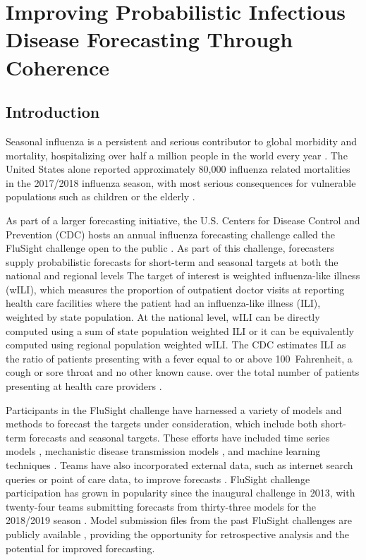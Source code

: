 \documentclass{umassthesis}          %
\begin{document}
\chapter{Improving Probabilistic Infectious Disease Forecasting Through Coherence}
\section{Introduction}
Seasonal influenza is a persistent and serious contributor to global morbidity and mortality, hospitalizing over half a million people in the world every year \cite{lafond2016global}. The United States alone reported approximately 80,000 influenza related mortalities in the 2017/2018 influenza season, with most serious consequences for vulnerable populations such as children or the elderly \cite{reed2015estimating}.

As part of a larger forecasting initiative, the U.S. Centers for Disease Control and Prevention (CDC) hosts an annual influenza forecasting challenge called the FluSight challenge open to the public \cite{mcgowan2019collaborative}\cite{biggerstaff2018results}. As part of this challenge, forecasters supply probabilistic forecasts for short-term and seasonal targets at both the national and regional levels The target of interest is weighted influenza-like illness (wILI), which measures the proportion of outpatient doctor visits at reporting health care facilities where the patient had an influenza-like illness (ILI), weighted by state population. At the national level, wILI can be directly computed using a sum of state population weighted ILI or it can be equivalently computed using regional population weighted wILI. The CDC estimates ILI as the ratio of patients presenting with a fever equal to or above 100\textdegree~Fahrenheit, a cough or sore throat and no other known cause. over the total number of patients presenting at health care providers {\cite{thompson2010estimates}}. 

Participants in the FluSight challenge have harnessed a variety of models and methods to forecast the targets under consideration, which include both short-term forecasts and seasonal targets. These efforts have included time series models \cite{kandula2019near}, mechanistic disease transmission models \cite{osthus2017forecasting}\cite{osthus2019dynamic}, and machine learning techniques \cite{brooks2018nonmechanistic}\cite{kandula2018evaluation}\cite{adhikari2019epideep}\cite{reich2019accuracy}. Teams have also incorporated external data, such as internet search queries or point of care data, to improve forecasts \cite{dugas2013Influenza}\cite{araz2014using}\cite{volkova2017forecasting}\cite{osthus2019even}. FluSight challenge participation has grown in popularity since the inaugural challenge in 2013, with twenty-four teams submitting forecasts from thirty-three models for the 2018/2019 season \cite{forecasts}.  Model submission files from the past FluSight challenges are publicly available \cite{forecasts}, providing the opportunity for retrospective analysis and the potential for improved forecasting.
\end{document}
